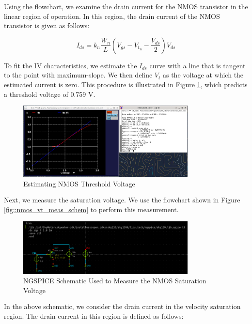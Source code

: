 \documentclass[fleqn]{article}
\begin{document}
	\noindent Using the flowchart, we examine the drain current for the NMOS transistor in the linear region of operation. In this region, the drain current of the NMOS transistor is given as follows:
	
	\begin{equation}
		I_{ds} = k_n\frac{W_n}{L}\left(V_{gs} - V_{t_n} - \frac{V_{ds}}{2}\right)V_{ds}
	\end{equation}
	
	\noindent To fit the IV characteristics, we estimate the $I_{ds}$ curve with a line that is tangent to the point with maximum-slope. We then define $V_t$ as the voltage at which the estimated current is zero. This procedure is illustrated in Figure \ref{fig::nmos_vt_meas}, which predicts a threshold voltage of 0.759 V.
	
	\begin{figure}[H]
		\centerline{\includegraphics[width=0.8\textwidth]{nmos_vt_meas.png}}
		\caption{Estimating NMOS Threshold Voltage}
		\label{fig::nmos_vt_meas}
	\end{figure}
	
	Next, we measure the saturation voltage. We use the flowchart shown in Figure \ref{fig::nmos_vt_meas_schem} to perform this measurement.
	
	\begin{figure}[H]
		\centerline{\includegraphics[width=0.8\textwidth]{nmos_vt_meas_schem.png}}
		\caption{NGSPICE Schematic Used to Measure the NMOS Saturation Voltage}
		\label{fig::nmos_vdsat_meas_schem}
	\end{figure}
	
	 \noindent In the above schematic, we consider the drain current in the velocity saturation region. The drain current in this region is defined as follows:
	
\end{document}
